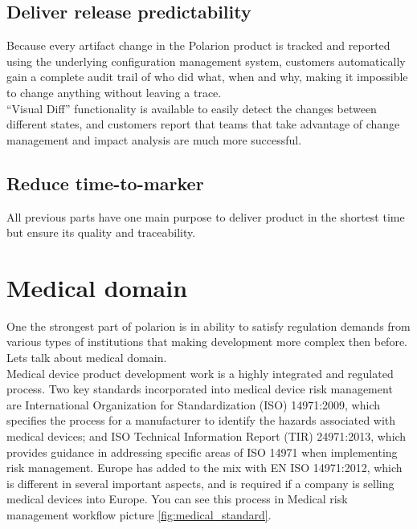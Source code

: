 \documentclass[thesis=M,english]{FITthesis}[2012/06/26]
\begin{document}
\subsection{Deliver release predictability}

Because every artifact change in the Polarion product is tracked and reported using the underlying configuration management system, customers automatically gain a complete audit trail of who did what, when and why, making it impossible to change anything without leaving a trace.\\

“Visual Diff” functionality is available to easily detect the changes between different states, and customers report that teams that take advantage of change management and impact analysis are much more successful.

\subsection{Reduce time-to-marker}

All previous parts have one main purpose to deliver product in the shortest time but ensure its quality and traceability.\\
 

\section{Medical domain}

One the strongest part of \acrshort{polarion} is in ability to satisfy regulation demands from various types of institutions that making development more complex then before. \\

Lets talk about medical domain.\\

Medical device product development work is a highly integrated and regulated process. Two key standards incorporated into medical device risk management are International Organization for Standardization (ISO) 14971:2009, which specifies the process for a manufacturer to identify the hazards associated with medical devices; and ISO Technical Information Report (TIR) 24971:2013, which provides guidance in addressing specific areas of ISO 14971 when implementing risk management. Europe has added to the mix with EN ISO 14971:2012, which is different in several important aspects, and is required if a company is selling medical devices into Europe. You can see this process in Medical risk management workflow picture \ref{fig:medical_standard}.\\
\end{document}
